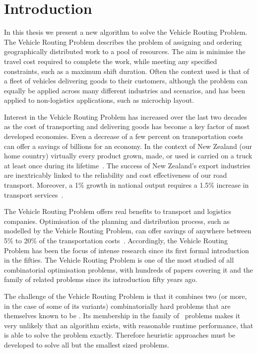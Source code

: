 
\chapter{Introduction}

In this thesis we present a new algorithm to solve the Vehicle Routing Problem. The Vehicle Routing Problem describes the problem of assigning and ordering geographically distributed work to a pool of resources. The aim is minimise the travel cost required to complete the work, while meeting any specified constraints, such as a maximum shift duration. Often the context used is that of a fleet of vehicles delivering goods to their customers, although the problem can equally be applied across many different industries and scenarios, and has been applied to non-logistics applications, such as microchip layout. 

Interest in the Vehicle Routing Problem has increased over the last two decades as the cost of transporting and delivering goods has become a key factor of most developed economies. Even a decrease of a few percent on transportation costs can offer a savings of billions for an economy. In the context of New Zealand (our home country) virtually every product grown, made, or used is carried on a truck at least once during its lifetime~\cite{RTFNZ}. The success of New Zealand's export industries are inextricably linked to the reliability and cost effectiveness of our road transport. Moreover, a 1\% growth in national output requires a 1.5\% increase in transport services~\cite{RTFNZ}. 

The Vehicle Routing Problem offers real benefits to transport and logistics companies. Optimisation of the planning and distribution process, such as modelled by the Vehicle Routing Problem, can offer savings of anywhere between 5\% to 20\% of the transportation costs~\cite{TV2001}. Accordingly, the Vehicle Routing Problem has been the focus of intense research since its first formal introduction in the fifties. The Vehicle Routing Problem is one of the most studied of all combinatorial optimisation problems, with hundreds of papers covering it and the family of related problems since its introduction fifty years ago.

The challenge of the Vehicle Routing Problem is that it combines two (or more, in the case of some of its variants) combinatorially hard problems that are themselves known to be \nphard. Its membership in the family of \nphard\ problems makes it very unlikely that an algorithm exists, with reasonable runtime performance, that is able to solve the problem exactly. Therefore heuristic approaches must be developed to solve all but the smallest sized problems.

